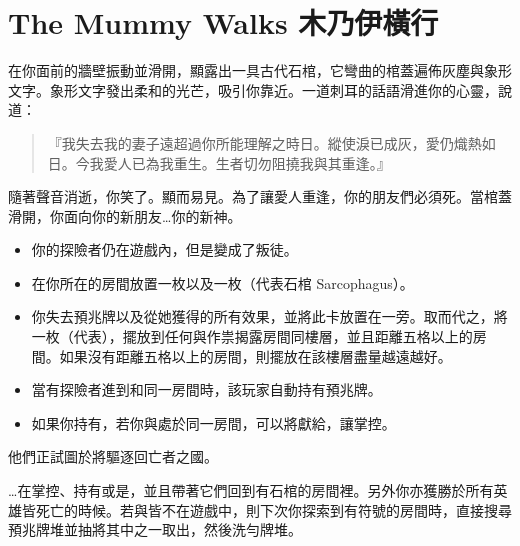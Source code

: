 
\chapter{The Mummy Walks 木乃伊橫行}

\begin{HauntStory}
  在你面前的牆壁振動並滑開，顯露出一具古代石棺，它彎曲的棺蓋遍佈灰塵與象形文字。象形文字發出柔和的光芒，吸引你靠近。一道刺耳的話語滑進你的心靈，說道：
  \begin{quote}
    『我失去我的妻子遠超過你所能理解之時日。縱使淚已成灰，愛仍熾熱如日。今我愛人已為我重生。生者切勿阻撓我與其重逢。』
  \end{quote}
  隨著聲音消逝，你笑了。顯而易見。為了讓愛人重逢，你的朋友們必須死。當棺蓋滑開，你面向你的新朋友…你的新神。
\end{HauntStory}

\vspace*{-1em}
\begin{itemize}
  \item 你的探險者仍在遊戲內，但是變成了叛徒。
  \item 在你所在的房間放置一枚以及一枚（代表石棺 Sarcophagus）。
  \item 你失去預兆牌以及從她獲得的所有效果，並將此卡放置在一旁。取而代之，將一枚（代表），擺放到任何與作祟揭露房間同樓層，並且距離五格以上的房間。如果沒有距離五格以上的房間，則擺放在該樓層盡量越遠越好。
  \item 當有探險者進到和同一房間時，該玩家自動持有預兆牌。
  \item 如果你持有，若你與處於同一房間，可以將獻給，讓掌控。
\end{itemize}

他們正試圖於將驅逐回亡者之國。

…在掌控、持有或是，並且帶著它們回到有石棺的房間裡。另外你亦獲勝於所有英雄皆死亡的時候。若與皆不在遊戲中，則下次你探索到有\OmenSymbol{}符號的房間時，直接搜尋預兆牌堆並抽將其中之一取出，然後洗勻牌堆。

\vfill\null\pagebreak


